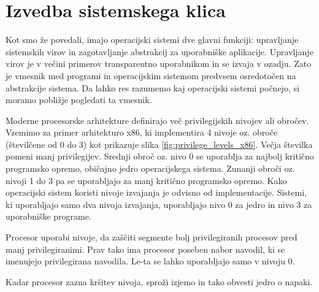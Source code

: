 \documentclass[a4paper,12pt,openright]{book}
\begin{document}

\section{Izvedba sistemskega klica} \label{sec:syscall_execution}

Kot smo že povedali, imajo operacijski sistemi dve glavni funkciji: upravljanje sistemskih virov in zagotavljanje abstrakcij za uporabniške aplikacije.
Upravljanje virov je v večini primerov transparentno uporabnikom in se izvaja v ozadju. Zato je vmesnik med programi in operacijskim sistemom predvsem osredotočen na abstrakcije sistema.
Da lahko res razumemo kaj operacijski sistemi počnejo, si moramo pobližje pogledati ta vmesnik.
\cite{Tanenbaum_Bos_2023}

Moderne procesorske arhitekture definirajo več privilegijskih nivojev ali obročev.
Vzemimo za primer arhitekturo x86, ki implementira 4 nivoje oz. obroče (številčene od 0 do 3) kot prikazuje slika \ref{fig:privilege_levels_x86}.
Večja številka pomeni manj privilegijev.
Srednji obroč oz. nivo 0 se uporablja za najbolj kritično programsko opremo, običajno jedro operacijskega sistema.
Zunanji obroči oz. nivoji 1 do 3 pa se uporabljajo za manj kritično programsko opremo.
Kako operacijski sistem koristi nivoje izvajanja je odvisno od implementacije.
Sistemi, ki uporabljajo samo dva nivoja izvajanja, uporabljajo nivo 0 za jedro in nivo 3 za uporabniške programe.

Procesor uporabi nivoje, da zaščiti segmente bolj privilegiranih procesov pred manj privilegiranimi.
Prav tako ima procesor poseben nabor navodil, ki se imenujejo privilegirana navodila.
Le-ta se lahko uporabljajo samo v nivoju 0.

Kadar procesor zazna kršitev nivoja, sproži izjemo in tako obvesti jedro o napaki.
\cite{Intel_2024}
\end{document}
